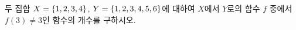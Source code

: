 두 집합 $X=\{1{,}\mkern3mu\mathopen{}2{,}\mkern3mu\mathopen{}3{,}\mkern3mu\mathopen{}4\}$, $Y=\{1{,}\mkern3mu\mathopen{}2{,}\mkern3mu\mathopen{}3{,}\mkern3mu\mathopen{}4{,}\mkern3mu\mathopen{}5{,}\mkern3mu\mathopen{}6\}$에 대하여 $X$에서 $Y$로의 함수 $f$ 중에서 $f(3)\ne 3$인 함수의 개수를 구하시오.
